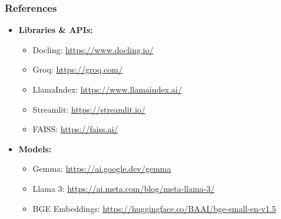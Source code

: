 \begin{frame}[fragile]\frametitle{References}
    \begin{itemize}
        \item \textbf{Libraries \& APIs:}
        \begin{itemize}
            \item Docling: \url{https://www.docling.io/}
            \item Groq: \url{https://groq.com/}
            \item LlamaIndex: \url{https://www.llamaindex.ai/}
            \item Streamlit: \url{https://streamlit.io/}
            \item FAISS: \url{https://faiss.ai/}
        \end{itemize}
        \item \textbf{Models:}
        \begin{itemize}
            \item Gemma: \url{https://ai.google.dev/gemma}
            \item Llama 3: \url{https://ai.meta.com/blog/meta-llama-3/}
            \item BGE Embeddings: \url{https://huggingface.co/BAAI/bge-small-en-v1.5}
        \end{itemize}
    \end{itemize}
\end{frame}

